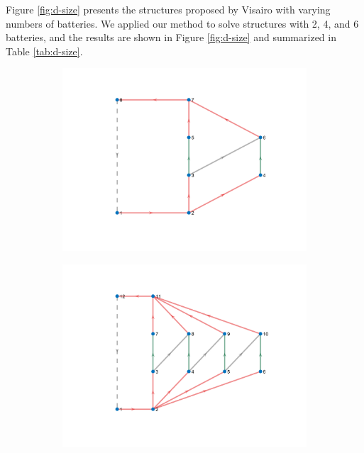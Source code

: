 \documentclass{article}
\begin{document}
Figure \ref{fig:d-size} presents the structures proposed by Visairo \cite{visairoReconfigurableBatteryPack2008} with varying numbers of batteries.
We applied our method to solve structures with 2, 4, and 6 batteries, and the results are shown in Figure \ref{fig:d-size} and summarized in Table \ref{tab:d-size}.

\begin{figure}[htbp]
    \centering
    \begin{subfigure}[b]{0.3\textwidth}
        \includegraphics[width=\textwidth]{../attachments/f-dege-mac-2.png}
        \caption{}
        \label{fig:d-size-2}
    \end{subfigure}
    \hspace{0.05\textwidth}
    \begin{subfigure}[b]{0.3\textwidth}
        \includegraphics[width=\textwidth]{../attachments/f-dege-mac-4.png}

\end{subfigure}
\end{figure}
\end{document}
